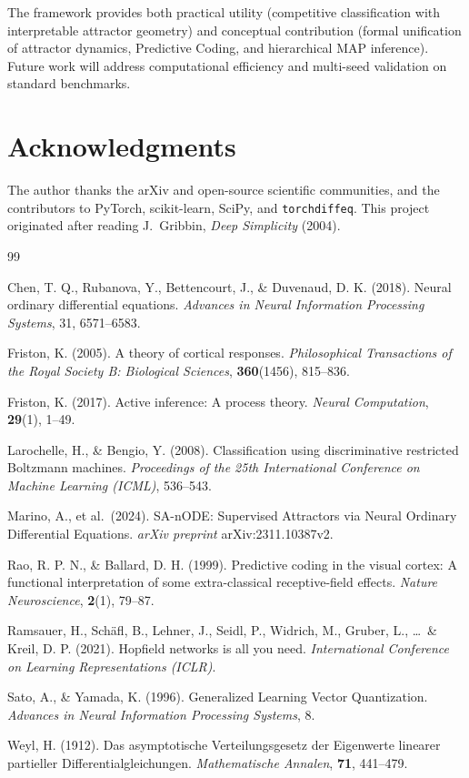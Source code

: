 \documentclass[11pt,a4paper]{article}
\begin{document}
The framework provides both practical utility (competitive classification with interpretable
attractor geometry) and conceptual contribution (formal unification of attractor dynamics,
Predictive Coding, and hierarchical MAP inference).  Future work will address computational
efficiency and multi-seed validation on standard benchmarks.

\section*{Acknowledgments}

The author thanks the arXiv and open-source scientific communities, and the contributors to
PyTorch, scikit-learn, SciPy, and \texttt{torchdiffeq}.  This project originated after reading
J.~Gribbin, \textit{Deep Simplicity} (2004).

\begin{thebibliography}{99}

Chen, T. Q., Rubanova, Y., Bettencourt, J., \& Duvenaud, D. K. (2018).
Neural ordinary differential equations.
\textit{Advances in Neural Information Processing Systems}, 31, 6571--6583.

Friston, K. (2005).
A theory of cortical responses.
\textit{Philosophical Transactions of the Royal Society B: Biological Sciences},
\textbf{360}(1456), 815--836.

Friston, K. (2017).
Active inference: A process theory.
\textit{Neural Computation}, \textbf{29}(1), 1--49.

Larochelle, H., \& Bengio, Y. (2008).
Classification using discriminative restricted Boltzmann machines.
\textit{Proceedings of the 25th International Conference on Machine Learning (ICML)},
536--543.

Marino, A., et al.\ (2024).
SA-nODE: Supervised Attractors via Neural Ordinary Differential Equations.
\textit{arXiv preprint} arXiv:2311.10387v2.

Rao, R. P. N., \& Ballard, D. H. (1999).
Predictive coding in the visual cortex: A functional interpretation of some
extra-classical receptive-field effects.
\textit{Nature Neuroscience}, \textbf{2}(1), 79--87.

Ramsauer, H., Sch\"{a}fl, B., Lehner, J., Seidl, P., Widrich, M., Gruber, L.,
\ldots\ \& Kreil, D. P. (2021).
Hopfield networks is all you need.
\textit{International Conference on Learning Representations (ICLR)}.

Sato, A., \& Yamada, K. (1996).
Generalized Learning Vector Quantization.
\textit{Advances in Neural Information Processing Systems}, 8.

Weyl, H. (1912).
Das asymptotische Verteilungsgesetz der Eigenwerte linearer partieller
Differentialgleichungen.
\textit{Mathematische Annalen}, \textbf{71}, 441--479.

\end{thebibliography}
\end{document}
